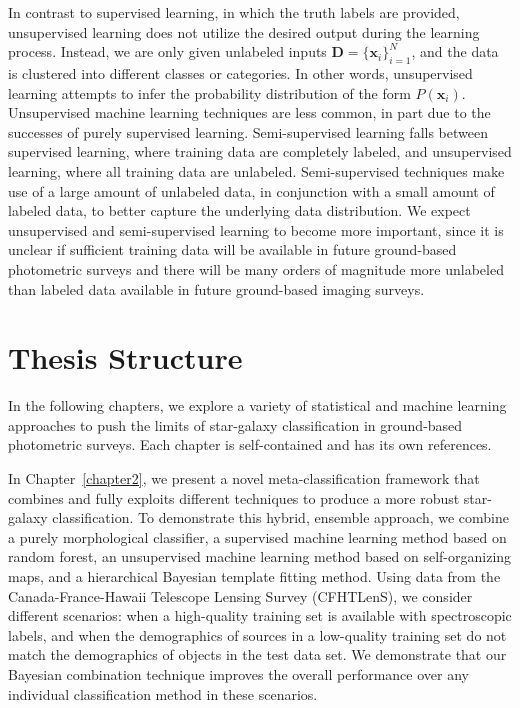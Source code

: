 In contrast to supervised learning, in which the truth labels are provided,
unsupervised learning does not utilize the desired output during the learning process.
Instead, we are only given unlabeled inputs $\mathbf{D}= \{ \mathbf{x}_i \}_{i=1}^N$,
and the data is clustered into different classes or categories.
In other words, unsupervised learning attempts to infer the probability distribution of the form $P(\mathbf{x}_i)$.
Unsupervised machine learning techniques are less common, in part due to the successes of purely supervised learning.
Semi-supervised learning falls between supervised learning, where training data are completely labeled,
and unsupervised learning, where all training data are unlabeled.
Semi-supervised techniques make use of a large amount of unlabeled data, in conjunction with a small amount of labeled data,
to better capture the underlying data distribution.
We expect unsupervised and semi-supervised learning to become more important, since
it is unclear if sufficient training data will be available in future ground-based photometric surveys and
there will be many orders of magnitude more unlabeled than labeled data available in future ground-based imaging surveys.

\section{Thesis Structure}

In the following chapters, we explore a variety of statistical and machine learning approaches to push the limits of
star-galaxy classification in ground-based photometric surveys.
Each chapter is self-contained and has its own references.

In Chapter~\ref{chapter2}, we present a novel meta-classification
framework that combines and fully exploits different techniques
to produce a more robust star-galaxy classification.
To demonstrate this hybrid, ensemble approach,
we combine a purely morphological classifier,
a supervised machine learning method based on random forest,
an unsupervised machine learning method based on self-organizing maps,
and a hierarchical Bayesian template fitting method.
Using data from the Canada-France-Hawaii Telescope Lensing Survey (CFHTLenS),
we consider different scenarios:
when a high-quality training set is available with spectroscopic labels,
and when the demographics of sources in a low-quality training set
do not match the demographics of objects in the test data set.
We demonstrate that our Bayesian combination technique improves
the overall performance over any individual classification method
in these scenarios.

